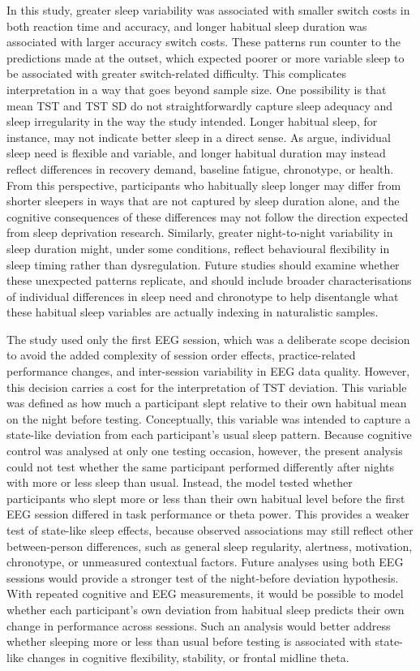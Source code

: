 \documentclass[12pt,a4paper]{report}
\begin{document}
In this study, greater sleep variability was associated with smaller switch costs in both reaction time and accuracy, and longer habitual sleep duration was associated with larger accuracy switch costs. These patterns run counter to the predictions made at the outset, which expected poorer or more variable sleep to be associated with greater switch-related difficulty. This complicates interpretation in a way that goes beyond sample size. One possibility is that mean TST and TST SD do not straightforwardly capture sleep adequacy and sleep irregularity in the way the study intended. Longer habitual sleep, for instance, may not indicate better sleep in a direct sense. As \textcite{fjell2024sleep} argue, individual sleep need is flexible and variable, and longer habitual duration may instead reflect differences in recovery demand, baseline fatigue, chronotype, or health. From this perspective, participants who habitually sleep longer may differ from shorter sleepers in ways that are not captured by sleep duration alone, and the cognitive consequences of these differences may not follow the direction expected from sleep deprivation research. Similarly, greater night-to-night variability in sleep duration might, under some conditions, reflect behavioural flexibility in sleep timing rather than dysregulation. Future studies should examine whether these unexpected patterns replicate, and should include broader characterisations of individual differences in sleep need and chronotype to help disentangle what these habitual sleep variables are actually indexing in naturalistic samples.


The study used only the first EEG session, which was a deliberate scope decision to avoid the added complexity of session order effects, practice-related performance changes, and inter-session variability in EEG data quality. However, this decision carries a cost for the interpretation of TST deviation. This variable was defined as how much a participant slept relative to their own habitual mean on the night before testing. Conceptually, this variable was intended to capture a state-like deviation from each participant's usual sleep pattern. Because cognitive control was analysed at only one testing occasion, however, the present analysis could not test whether the same participant performed differently after nights with more or less sleep than usual. Instead, the model tested whether participants who slept more or less than their own habitual level before the first EEG session differed in task performance or theta power. This provides a weaker test of state-like sleep effects, because observed associations may still reflect other between-person differences, such as general sleep regularity, alertness, motivation, chronotype, or unmeasured contextual factors. Future analyses using both EEG sessions would provide a stronger test of the night-before deviation hypothesis. With repeated cognitive and EEG measurements, it would be possible to model whether each participant's own deviation from habitual sleep predicts their own change in performance across sessions. Such an analysis would better address whether sleeping more or less than usual before testing is associated with state-like changes in cognitive flexibility, stability, or frontal midline theta.
\end{document}
